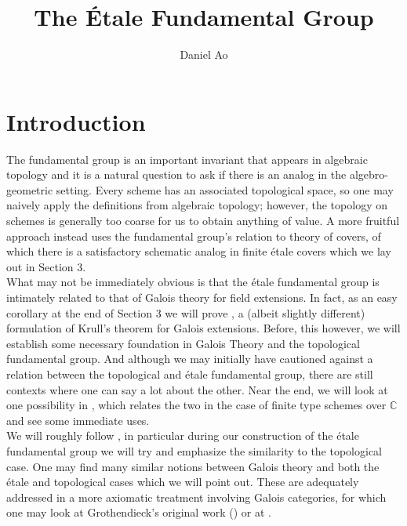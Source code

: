 \documentclass{article}
\theoremstyle{definition}
\theoremstyle{remark}
\newcommand{\C}{\mathbb{C}}
\begin{document}
\title{The \'Etale Fundamental Group}
\author{Daniel Ao}

\maketitle

\tableofcontents

\section{Introduction}

The fundamental group is an important invariant that appears in algebraic topology and it is a natural question to ask if there is an analog in the algebro-geometric setting.
Every scheme has an associated topological space, so one may naively apply the definitions from algebraic topology; however, the topology on schemes is generally too coarse for us to obtain anything of value.
A more fruitful approach instead uses the fundamental group's relation to theory of covers, of which there is a satisfactory schematic analog in finite \'etale covers which we lay out in Section 3.\\

What may not be immediately obvious is that the \'etale fundamental group is intimately related to that of Galois theory for field extensions. 
In fact, as an easy corollary at the end of Section 3 we will prove , a (albeit slightly different) formulation of Krull's theorem for Galois extensions.
Before, this however, we will establish some necessary foundation in Galois Theory and the topological fundamental group. 
And although we may initially have cautioned against a relation between the topological and \'etale fundamental group, there are still contexts where one can say a lot about the other.
Near the end, we will look at one possibility in , which relates the two in the case of finite type schemes over $\C$ and see some immediate uses.\\

\indent We will roughly follow \cite{Szamuely}, in particular during our construction of the \'etale fundamental group we will try and emphasize the similarity to the topological case.
One may find many similar notions between Galois theory and both the \'etale and topological cases which we will point out.
These are adequately addressed in a more axiomatic treatment involving Galois categories, for which one may look at Grothendieck's original work (\cite{grothendieck}) or at \cite{Lenstra}.
\end{document}
